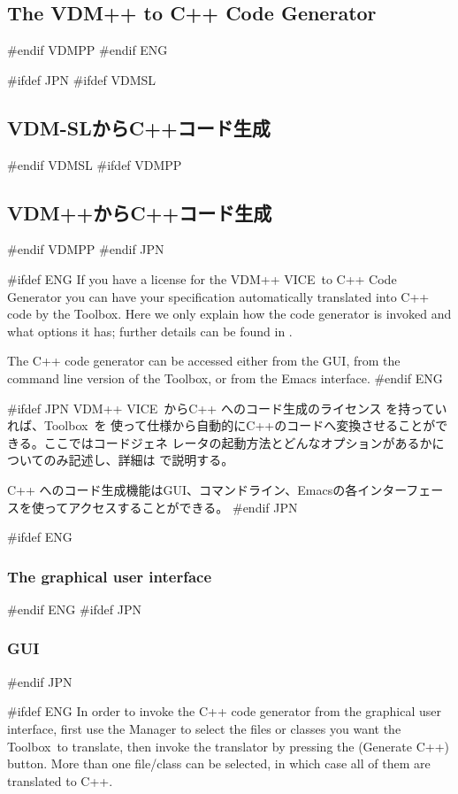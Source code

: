 \documentclass[\pformat,12pt]{article}
\newcommand{\vdmslpp}{VDM-SL}
\newcommand{\Toolbox}{Toolbox}
\newcommand{\vdmslpp}{VDM++}
\newcommand{\Toolbox}{Toolbox}
\renewcommand{\vdmslpp}{VDM++ VICE}
\newcommand{\guicmd}[1]{{\sf #1}}
\newcommand{\guicmd}[1]{{\gt #1}}
\begin{document}
\subsection{The VDM++ to C++ Code Generator}\label{sec:cg}
#endif VDMPP
#endif ENG

#ifdef JPN
#ifdef VDMSL
\subsection{VDM-SLからC++コード生成}\label{sec:cg}
#endif VDMSL
#ifdef VDMPP
\subsection{VDM++からC++コード生成}\label{sec:cg}
#endif VDMPP
#endif JPN

#ifdef ENG
If you have a license  for the \vdmslpp\ to C++
Code Generator you can have your specification automatically 
translated into C++ code by the \Toolbox. Here we only explain how the
code generator is invoked and what options it has; further details can
be found in .

The C++ code generator can be accessed either from the GUI, from the
command line version of the \Toolbox, or from the Emacs interface.
#endif ENG

#ifdef JPN
\vdmslpp\  からC++ へのコード生成のライセンス を持っていれば、\Toolbox\ を
使って仕様から自動的にC++のコードへ変換させることができる。ここではコードジェネ
レータの起動方法とどんなオプションがあるかについてのみ記述し、詳細は%
で説明する。

C++ へのコード生成機能はGUI、コマンドライン、Emacsの各インターフェースを使ってアクセスすることができる。
#endif JPN

#ifdef ENG
\subsubsection{The graphical user interface}
#endif ENG
#ifdef JPN
\subsubsection{GUI}
#endif JPN

#ifdef ENG
In order to invoke the C++ code generator from the graphical user
interface, first use the \guicmd{Manager} to select the files or
classes you want the \Toolbox\ to translate, then invoke the
translator by pressing the 
(\guicmd{Generate C++}) button. More than one file/class can be
selected, in which case all of them are translated to C++.
\end{document}
